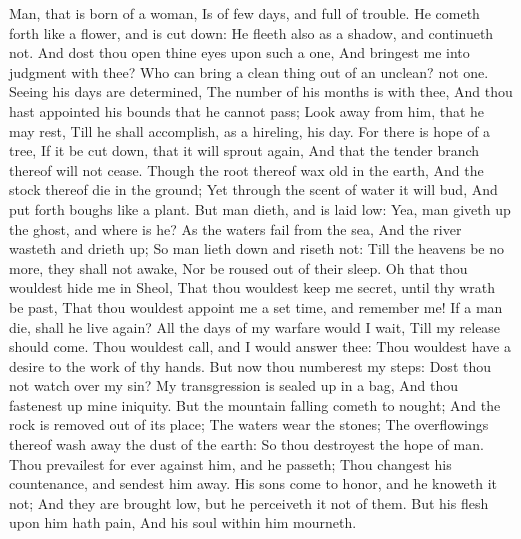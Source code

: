 Man, that is born of a woman, Is of few days, and full of trouble.  He cometh forth like a flower, and is cut down: He fleeth also as a shadow, and continueth not.  And dost thou open thine eyes upon such a one, And bringest me into judgment with thee?  Who can bring a clean thing out of an unclean? not one.  Seeing his days are determined, The number of his months is with thee, And thou hast appointed his bounds that he cannot pass;  Look away from him, that he may rest, Till he shall accomplish, as a hireling, his day.  For there is hope of a tree, If it be cut down, that it will sprout again, And that the tender branch thereof will not cease.  Though the root thereof wax old in the earth, And the stock thereof die in the ground;  Yet through the scent of water it will bud, And put forth boughs like a plant.  But man dieth, and is laid low: Yea, man giveth up the ghost, and where is he?  As the waters fail from the sea, And the river wasteth and drieth up;  So man lieth down and riseth not: Till the heavens be no more, they shall not awake, Nor be roused out of their sleep.  Oh that thou wouldest hide me in Sheol, That thou wouldest keep me secret, until thy wrath be past, That thou wouldest appoint me a set time, and remember me!  If a man die, shall he live again? All the days of my warfare would I wait, Till my release should come.  Thou wouldest call, and I would answer thee: Thou wouldest have a desire to the work of thy hands.  But now thou numberest my steps: Dost thou not watch over my sin?  My transgression is sealed up in a bag, And thou fastenest up mine iniquity.  But the mountain falling cometh to nought; And the rock is removed out of its place;  The waters wear the stones; The overflowings thereof wash away the dust of the earth: So thou destroyest the hope of man.  Thou prevailest for ever against him, and he passeth; Thou changest his countenance, and sendest him away.  His sons come to honor, and he knoweth it not; And they are brought low, but he perceiveth it not of them.  But his flesh upon him hath pain, And his soul within him mourneth. 

